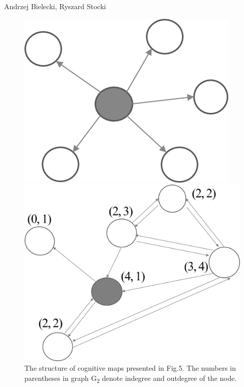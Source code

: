 \begin{artengenv2auth}{Andrzej Bielecki, Ryszard Stocki}
\begin{figure}[htbp]
 \begin{minipage}[b]{.4\textwidth}
   \centering
   \includegraphics[width=\textwidth]{ART_Bielecki/fig9.png}
 \end{minipage}%
 \hfill
 \begin{minipage}[b]{.53\textwidth}
   \centering
   \includegraphics[width=\textwidth]{ART_Bielecki/fig10.png}
 \end{minipage}
 \caption{The structure of cognitive maps presented in Fig.5. The numbers in parentheses in graph G\textsubscript{2} denote indegree and outdegree of the node.}
 \label{bie:fig6}
\end{figure}





\end{artengenv2auth}
